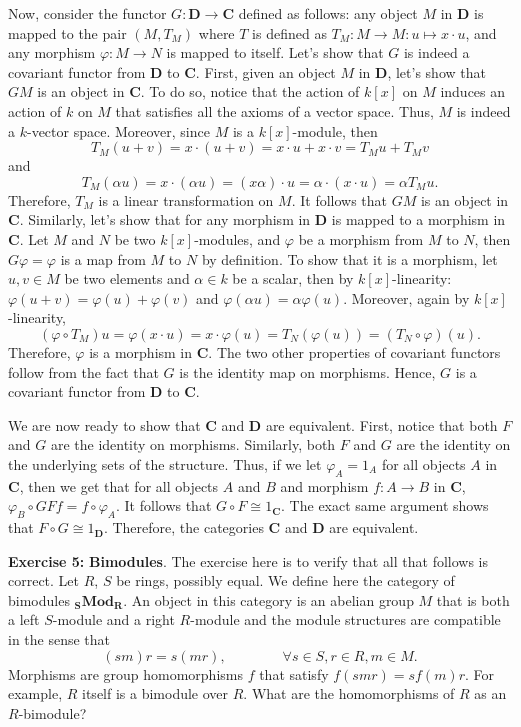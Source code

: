 \documentclass{article}
\newcommand{\CatC}{\textbf{C}}
\newcommand{\CatD}{\textbf{D}}
\newcommand{\CatMod}[1]{_\textbf{#1}\textbf{Mod}}
\newcommand{\isomorphic}{\cong}
\begin{document}
Now, consider the functor $G : \CatD \to \CatC$ defined as follows: any object $M$ in $\CatD$ is mapped to the pair $(M, T_M)$ where $T$ is defined as $T_M : M \to M : u \mapsto x \cdot u$, and any morphism $\varphi : M \to N$ is mapped to itself. Let's show that $G$ is indeed a covariant functor from $\CatD$ to $\CatC$. First, given an object $M$ in $\CatD$, let's show that $GM$ is an object in $\CatC$. To do so, notice that the action of $k[x]$ on $M$ induces an action of $k$ on $M$ that satisfies all the axioms of a vector space. Thus, $M$ is indeed a $k$-vector space. Moreover, since $M$ is a $k[x]$-module, then
$$T_M(u+v) = x\cdot(u+v) = x\cdot u + x\cdot v = T_Mu + T_Mv$$
and
$$T_M(\alpha u) = x\cdot(\alpha u) = (x \alpha) \cdot u = \alpha \cdot (x \cdot u) = \alpha T_Mu.$$
Therefore, $T_M$ is a linear transformation on $M$. It follows that $GM$ is an object in $\CatC$. Similarly, let's show that for any morphism in $\CatD$ is mapped to a morphism in $\CatC$. Let $M$ and $N$ be two $k[x]$-modules, and $\varphi$ be a morphism from $M$ to $N$, then $G\varphi = \varphi$ is a map from $M$ to $N$ by definition. To show that it is a morphism, let $u,v \in M$ be two elements and $\alpha \in k$ be a scalar, then by $k[x]$-linearity: $\varphi(u + v) = \varphi(u) + \varphi(v)$ and $\varphi(\alpha u) = \alpha\varphi(u)$. Moreover, again by $k[x]$-linearity, 
$$(\varphi \circ T_M )u = \varphi(x \cdot u) = x \cdot \varphi(u) = T_N(\varphi(u)) = (T_N \circ \varphi)(u).$$
Therefore, $\varphi$ is a morphism in $\CatC$. The two other properties of covariant functors follow from the fact that $G$ is the identity map on morphisms. Hence, $G$ is a covariant functor from $\CatD$ to $\CatC$.

We are now ready to show that $\CatC$ and $\CatD$ are equivalent. First, notice that both $F$ and $G$ are the identity on morphisms. Similarly, both $F$ and $G$ are the identity on the underlying sets of the structure. Thus, if we let $\varphi_A = 1_A$ for all objects $A$ in $\CatC$, then we get that for all objects $A$ and $B$ and morphism $f : A \to B$ in $\CatC$, $\varphi_B \circ GFf = f \circ \varphi_A$. It follows that $G \circ F \isomorphic 1_{\CatC}$. The exact same argument shows that $F \circ G \isomorphic 1_{\CatD}$. Therefore, the categories $\CatC$ and $\CatD$ are equivalent.

\newpage

\noindent \textbf{Exercise 5:} \textbf{Bimodules}. The exercise here is to verify that all that follows is correct. Let $R$, $S$ be rings, possibly equal. We define here the category of bimodules $\CatMod{S}_{\textbf{R}}$. An object in this category is an abelian group $M$ that is both a left $S$-module and a right $R$-module and the module structures are compatible in the sense that
$$(sm)r = s(mr), \qquad \qquad \forall s\in S, r\in R, m \in M.$$
Morphisms are group homomorphisms $f$ that satisfy $f(smr) = sf(m)r$. For example, $R$ itself is a bimodule over $R$. What are the homomorphisms of $R$ as an $R$-bimodule?
\end{document}
